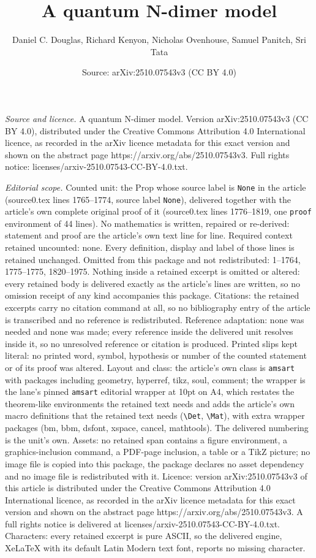 \documentclass[10pt,a4paper]{amsart}
\title[A quantum N-dimer model]{A quantum N-dimer model}
\author{Daniel C. Douglas, Richard Kenyon, Nicholas Ovenhouse, Samuel Panitch, Sri Tata}
\date{Source: arXiv:2510.07543v3 (CC BY 4.0)}
\begin{document}
\maketitle

\noindent\emph{Source and licence.} A quantum N-dimer model. Version arXiv:2510.07543v3 (CC BY 4.0), distributed under the Creative Commons Attribution 4.0 International licence, as recorded in the arXiv licence metadata for this exact version and shown on the abstract page https://arxiv.org/abs/2510.07543v3. Full rights notice: licenses/arxiv-2510.07543-CC-BY-4.0.txt.\par\smallskip

\noindent\textit{Editorial scope.} Counted unit: the Prop whose source label is \texttt{None} in the article (source0.tex lines 1765--1774, source label \texttt{None}), delivered together with the article's own complete original proof of it (source0.tex lines 1776--1819, one \texttt{proof} environment of 44 lines). No mathematics is written, repaired or re-derived: statement and proof are the article's own text line for line. Required context retained uncounted: none. Every definition, display and label of those lines is retained unchanged. Omitted from this package and not redistributed: 1--1764, 1775--1775, 1820--1975. Nothing inside a retained excerpt is omitted or altered: every retained body is delivered exactly as the article's lines are written, so no omission receipt of any kind accompanies this package. Citations: the retained excerpts carry no citation command at all, so no bibliography entry of the article is transcribed and no reference is redistributed. Reference adaptation: none was needed and none was made; every reference inside the delivered unit resolves inside it, so no unresolved reference or citation is produced. Printed slips kept literal: no printed word, symbol, hypothesis or number of the counted statement or of its proof was altered. Layout and class: the article's own class is \texttt{amsart} with packages including geometry, hyperref, tikz, soul, comment; the wrapper is the lane's pinned \texttt{amsart} editorial wrapper at 10pt on A4, which restates the theorem-like environments the retained text needs and adds the article's own macro definitions that the retained text needs (\texttt{\textbackslash Det}, \texttt{\textbackslash Mat}), with extra wrapper packages (bm, bbm, dsfont, xspace, cancel, mathtools). The delivered numbering is the unit's own. Assets: no retained span contains a figure environment, a graphics-inclusion command, a PDF-page inclusion, a table or a TikZ picture; no image file is copied into this package, the package declares no asset dependency and no image file is redistributed with it. Licence: version arXiv:2510.07543v3 of this article is distributed under the Creative Commons Attribution 4.0 International licence, as recorded in the arXiv licence metadata for this exact version and shown on the abstract page https://arxiv.org/abs/2510.07543v3. A full rights notice is delivered at licenses/arxiv-2510.07543-CC-BY-4.0.txt. Characters: every retained excerpt is pure ASCII, so the delivered engine, XeLaTeX with its default Latin Modern text font, reports no missing character.
\end{document}
